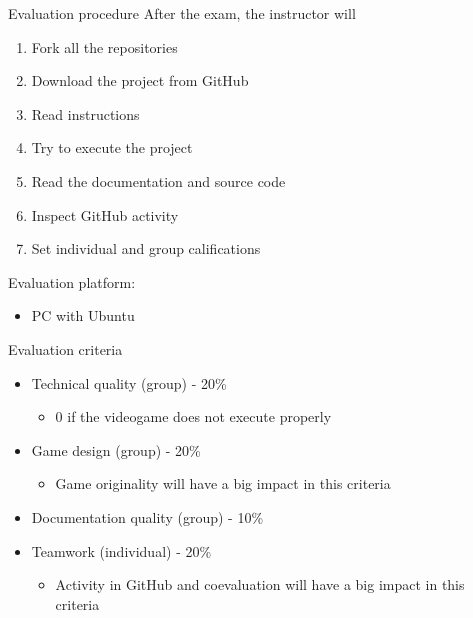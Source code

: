 \documentclass[10pt,compress]{beamer} %
\begin{document}
\begin{frame}{Evaluation procedure}
	After the exam, the instructor will
	\begin{enumerate}
	\item Fork all the repositories
	\item Download the project from GitHub
    \item Read instructions
	\item Try to execute the project
	\item Read the documentation and source code
	\item Inspect GitHub activity
	\item Set individual and group califications
	\end{enumerate}

	Evaluation platform:
	\begin{itemize}
	\item PC with Ubuntu
	\end{itemize}
\end{frame}

\begin{frame}{Evaluation criteria}
	\begin{itemize}	
	\item Technical quality (group) - 20\%
	    \begin{itemize}
	    \item $0$ if the videogame does not execute properly
	    \end{itemize}
	\item Game design (group) - 20\%
	    \begin{itemize}
	    \item Game originality will have a big impact in this criteria
	    \end{itemize}
	\item Documentation quality (group) - 10\%
	\item Teamwork (individual) - 20\%
	    \begin{itemize}
	    \item Activity in GitHub and coevaluation will have a big impact in this criteria
	    \end{itemize}
	\end{itemize}
\end{frame}
\end{document}
